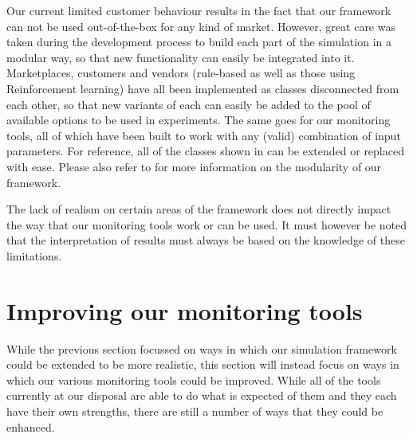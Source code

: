 Our current limited customer behaviour results in the fact that our framework can not be used out-of-the-box for any kind of market. However, great care was taken during the development process to build each part of the simulation in a modular way, so that new functionality can easily be integrated into it. Marketplaces, customers and vendors (rule-based as well as those using Reinforcement learning) have all been implemented as classes disconnected from each other, so that new variants of each can easily be added to the pool of available options to be used in experiments. The same goes for our monitoring tools, all of which have been built to work with any (valid) combination of input parameters. For reference, all of the classes shown in  can be extended or replaced with ease. Please also refer to \cite{LeoThesis} for more information on the modularity of our framework.

The lack of realism on certain areas of the framework does not directly impact the way that our monitoring tools work or can be used. It must however be noted that the interpretation of results must always be based on the knowledge of these limitations.

\section{Improving our monitoring tools}\label{sec:ImprovingMonitoringTools}

While the previous section focussed on ways in which our simulation framework could be extended to be more realistic, this section will instead focus on ways in which our various monitoring tools could be improved. While all of the tools currently at our disposal are able to do what is expected of them and they each have their own strengths, there are still a number of ways that they could be enhanced.


